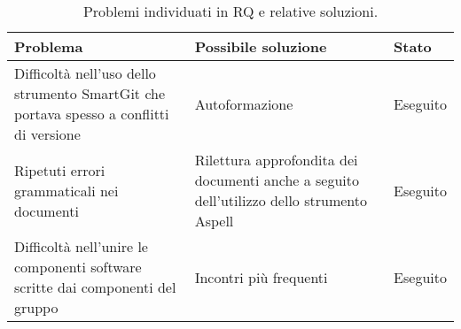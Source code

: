 		\begin{table}[H]
	    \begin{tabular}{ | p{5cm} | p{5cm} | p{2cm} | }
			\hline
			Problema & Possibile soluzione & Stato \\ \hline
            Difficoltà nell'uso dello strumento SmartGit che portava spesso a conflitti di versione
            &
            Autoformazione
            &
            Eseguito\\ \hline
            Ripetuti errori grammaticali nei documenti & Rilettura approfondita dei documenti anche a seguito dell'utilizzo dello strumento Aspell & Eseguito\\ \hline
            Difficoltà nell'unire le componenti software scritte dai componenti del gruppo 
            & Incontri più frequenti & Eseguito\\
            
			\hline
	    \end{tabular}
	    	\caption{Problemi individuati in RQ e relative soluzioni.}
		\end{table}